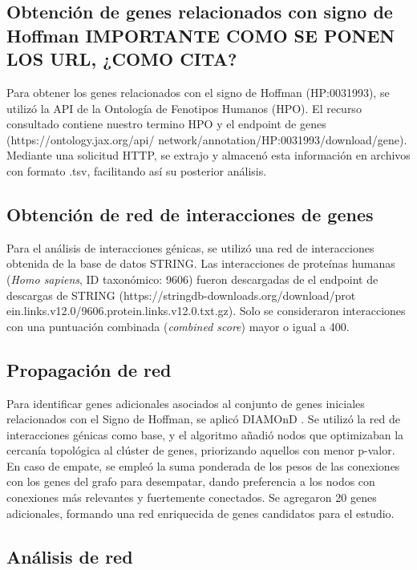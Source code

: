 \subsection{Obtención de genes relacionados con signo de Hoffman IMPORTANTE COMO SE PONEN LOS URL, ¿COMO CITA? }

Para obtener los genes relacionados con el signo de Hoffman (HP:0031993), se utilizó la API de la Ontología de Fenotipos Humanos (HPO). El recurso consultado contiene nuestro termino HPO y el endpoint de genes (https://ontology.jax.org/api/
network/annotation/HP:0031993/download/gene). Mediante una solicitud HTTP, se extrajo y almacenó esta información en archivos con formato .tsv, facilitando así su posterior análisis. 


\subsection{Obtención de red de interacciones de genes}

Para el análisis de interacciones génicas, se utilizó una red de interacciones obtenida de la base de datos STRING. Las interacciones de proteínas humanas (\textit{Homo sapiens}, ID taxonómico: 9606) fueron descargadas de el endpoint de descargas de STRING (https://stringdb-downloads.org/download/prot ein.links.v12.0/9606.protein.links.v12.0.txt.gz). Solo se consideraron interacciones con una puntuación combinada (\textit{combined score}) mayor o igual a 400.

\newpage

\subsection{Propagación de red}


Para identificar genes adicionales asociados al conjunto de genes iniciales relacionados con el Signo de Hoffman, se aplicó DIAMOnD \cite{Ghiassian2015}. Se utilizó la red de interacciones génicas como base, y el algoritmo añadió nodos que optimizaban la cercanía topológica al clúster de genes, priorizando aquellos con menor p-valor. En caso de empate, se empleó la suma ponderada de los pesos de las conexiones con los genes del grafo para desempatar, dando preferencia a los nodos con conexiones más relevantes y fuertemente conectados. Se agregaron 20 genes adicionales, formando una red enriquecida de genes candidatos para el estudio.


\subsection{Análisis de red}

